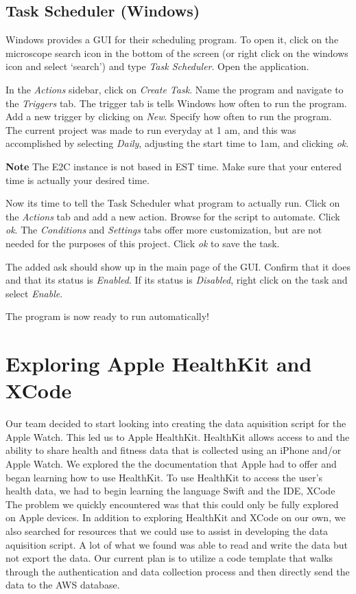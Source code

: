 \documentclass[]{book}
\begin{document}
\subsection{Task Scheduler (Windows)}\label{task-scheduler-windows}

Windows provides a GUI for their scheduling program. To open it, click
on the microscope search icon in the bottom of the screen (or right
click on the windows icon and select `search') and type \emph{Task
Scheduler}. Open the application.

In the \emph{Actions} sidebar, click on \emph{Create Task}. Name the
program and navigate to the \emph{Triggers} tab. The trigger tab is
tells Windows how often to run the program. Add a new trigger by
clicking on \emph{New}. Specify how often to run the program. The
current project was made to run everyday at 1 am, and this was
accomplished by selecting \emph{Daily}, adjusting the start time to 1am,
and clicking \emph{ok}.

\textbf{Note} The E2C instance is not based in EST time. Make sure that
your entered time is actually your desired time.

Now its time to tell the Task Scheduler what program to actually run.
Click on the \emph{Actions} tab and add a new action. Browse for the
script to automate. Click \emph{ok}. The \emph{Conditions} and
\emph{Settings} tabs offer more customization, but are not needed for
the purposes of this project. Click \emph{ok} to save the task.

The added ask should show up in the main page of the GUI. Confirm that
it does and that its status is \emph{Enabled}. If its status is
\emph{Disabled}, right click on the task and select \emph{Enable}.

The program is now ready to run automatically!

\section{Exploring Apple HealthKit and
XCode}\label{exploring-apple-healthkit-and-xcode}

Our team decided to start looking into creating the data aquisition
script for the Apple Watch. This led us to Apple HealthKit. HealthKit
allows access to and the ability to share health and fitness data that
is collected using an iPhone and/or Apple Watch. We explored the the
documentation that Apple had to offer and began learning how to use
HealthKit. To use HealthKit to access the user's health data, we had to
begin learning the language Swift and the IDE, XCode The problem we
quickly encountered was that this could only be fully explored on Apple
devices. In addition to exploring HealthKit and XCode on our own, we
also searched for resources that we could use to assist in developing
the data aquisition script. A lot of what we found was able to read and
write the data but not export the data. Our current plan is to utilize a
code template that walks through the authentication and data collection
process and then directly send the data to the AWS database.
\end{document}
